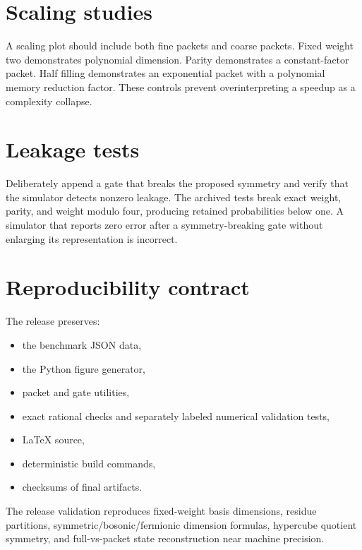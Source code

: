\section{Scaling studies}
A scaling plot should include both fine packets and coarse packets. Fixed weight two demonstrates polynomial dimension. Parity demonstrates a constant-factor packet. Half filling demonstrates an exponential packet with a polynomial memory reduction factor. These controls prevent overinterpreting a speedup as a complexity collapse.

\section{Leakage tests}
Deliberately append a gate that breaks the proposed symmetry and verify that the simulator detects nonzero leakage. The archived tests break exact weight, parity, and weight modulo four, producing retained probabilities below one. A simulator that reports zero error after a symmetry-breaking gate without enlarging its representation is incorrect.

\section{Reproducibility contract}
The release preserves:

\begin{itemize}
\item the benchmark JSON data,
\item the Python figure generator,
\item packet and gate utilities,
\item exact rational checks and separately labeled numerical validation tests,
\item LaTeX source,
\item deterministic build commands,
\item checksums of final artifacts.
\end{itemize}

\begin{recordbox}
The release validation reproduces fixed-weight basis dimensions, residue partitions, symmetric/bosonic/fermionic dimension formulas, hypercube quotient symmetry, and full-vs-packet state reconstruction near machine precision.
\end{recordbox}
